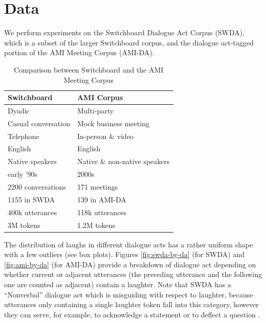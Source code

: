 \documentclass[11pt,a4paper]{article}
\begin{document}
\section{Data}
We perform experiments on the Switchboard Dialogue Act Corpus (SWDA), which is a subset of the larger Switchboard corpus, and the dialogue act-tagged portion of the AMI Meeting Corpus (AMI-DA). 


\begin{table}[]
\centering
\begin{tabular}{@{}ll@{}}
\toprule
\textbf{Switchboard}       & \textbf{AMI Corpus}                     \\ \midrule
Dyadic                     & Multi-party                             \\
Casual conversation        & Mock business meeting                   \\
Telephone                  & In-person \& video                      \\ \midrule
English                    & English                                 \\ 
Native speakers            & Native \& non-native speakers           \\ 
early '90s                 & 2000s                                   \\ \midrule
2200 conversations         & 171 meetings                            \\
  \hspace{1em} 1155 in SWDA               & \hspace{1em} 139 in AMI-DA                           \\
400k utterances             & 118k utterances                         \\
3M tokens                  & 1.2M tokens                             \\ \bottomrule
\end{tabular}
  \caption{Comparison between Switchboard and the AMI Meeting Corpus}
  \label{table:corpora}
\end{table}

The distribution of laughs in different dialogue acts has a rather uniform shape with a few outliers (see box plots). Figures \ref{fig:swda-by-da} (for SWDA) and \ref{fig:ami-by-da} (for AMI-DA) provide a breakdown of dialogue act depending on whether current or adjacent utterances (the preceding utterance and the following one are counted as adjacent) contain a laughter. Note that SWDA has a ``Nonverbal'' dialogue act which is misguiding with respect to laughter, because utterances only containing a single laughter token fall into this category, however they can serve, for example, to acknowledge a statement or to deflect a question  \citep{mazzocconi2019phd}.
\end{document}

